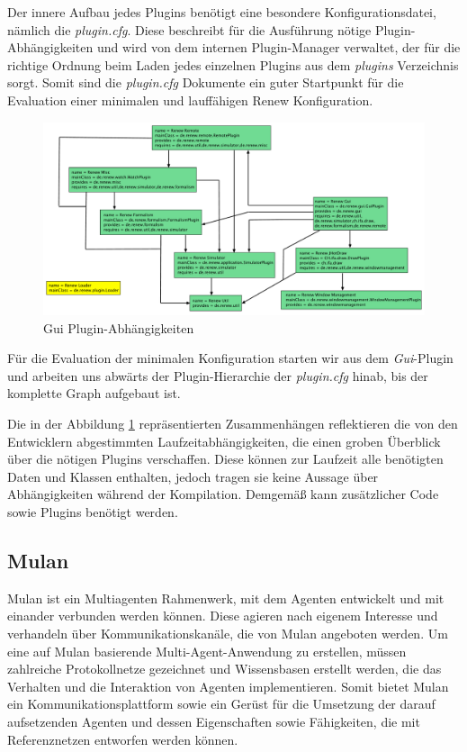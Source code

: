 	Der innere Aufbau jedes Plugins benötigt eine besondere Konfigurationsdatei, nämlich die \textit{plugin.cfg}. Diese beschreibt für die Ausführung nötige Plugin-Abhängigkeiten und wird von dem internen Plugin-Manager verwaltet, der für die richtige Ordnung beim Laden jedes einzelnen Plugins aus dem \textit{plugins} Verzeichnis sorgt. Somit sind die \textit{plugin.cfg} Dokumente ein guter Startpunkt für die Evaluation einer minimalen und lauffähigen Renew Konfiguration. \bigbreak

	\begin{figure}[h!]
	  \centering
	  \includegraphics[width=\textwidth]{material/images/renew_plugin_dependencies2.pdf}
	  \caption{Gui Plugin-Abhängigkeiten}
	  \label{fig:plugin_deps}
	\end{figure}

	Für die Evaluation der minimalen Konfiguration starten wir aus dem \textit{Gui}-Plugin und arbeiten uns abwärts der Plugin-Hierarchie der \textit{plugin.cfg} hinab, bis der komplette Graph aufgebaut ist.\newline

	Die in der Abbildung \ref{fig:plugin_deps} repräsentierten Zusammenhängen reflektieren die von den Entwicklern abgestimmten Laufzeitabhängigkeiten, die einen groben Überblick über die nötigen Plugins verschaffen. Diese können zur Laufzeit alle benötigten Daten und Klassen enthalten, jedoch tragen sie keine Aussage über Abhängigkeiten während der Kompilation. Demgemäß kann zusätzlicher Code sowie Plugins benötigt werden. 


\subsection{Mulan} \label{sub:mulan}
	Mulan \cite{Roelke04} ist ein Multiagenten Rahmenwerk, mit dem Agenten entwickelt und mit einander verbunden werden können. Diese agieren nach eigenem Interesse und verhandeln über Kommunikationskanäle, die von Mulan angeboten werden. Um eine auf Mulan basierende Multi-Agent-Anwendung zu erstellen, müssen zahlreiche Protokollnetze gezeichnet und Wissensbasen erstellt werden, die das Verhalten und die Interaktion von Agenten implementieren. Somit bietet Mulan ein Kommunikationsplattform sowie ein Gerüst für die Umsetzung der darauf aufsetzenden Agenten und dessen Eigenschaften sowie Fähigkeiten, die mit Referenznetzen entworfen werden können. \cite{cabac} \bigbreak


